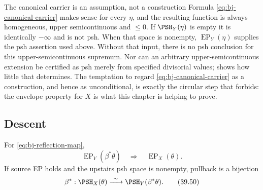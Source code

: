 \begin{warning}{The canonical carrier is an assumption, not a construction}
\label{warn:ch39-canonical-carrier}
Formula \eqref{eq:bj-canonical-carrier} makes sense for every
$\eta$, and the resulting function is always homogeneous, upper
semicontinuous and $\le0$.  If $\PSH_Y(\eta)$ is empty it is
identically $-\infty$ and is not psh.  When that space is nonempty,
$\operatorname{EP}_Y(\eta)$ supplies the psh assertion used above.
Without that input, there is no psh conclusion for this
upper-semicontinuous supremum.  Nor can an arbitrary upper-semicontinuous
extension be certified as psh merely from specified divisorial values;
 shows how little that determines.  The
temptation to regard \eqref{eq:bj-canonical-carrier} as a construction, and
hence  as unconditional, is exactly the
circular step that  forbids: the envelope property
for $X$ is what this chapter is helping to prove.
\end{warning}

\par{}
\begin{samepage}
\subsection{Descent}
\label{sec:ch39-ep-descent}

\begin{theorem}
\label{thm:bj-birational-ep-descent}
For \eqref{eq:bj-reflection-map},
\[
 \operatorname{EP}_Y(\beta^*\theta)
 \quad\Longrightarrow\quad
 \operatorname{EP}_X(\theta).
\tag{39.49}\label{eq:bj-birational-ep-descent}
\]
If source EP holds and the upstairs psh space is nonempty, pullback is a
bijection
\[
 \beta^*:\PSH_X(\theta)
       \xrightarrow{\ \sim\ }\PSH_Y(\beta^*\theta).
\tag{39.50}\label{eq:bj-ordinary-reflection-under-ep}
\]
\end{theorem}
\end{samepage}

